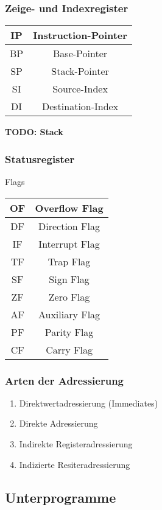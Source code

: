 \subsubsection{Zeige- und Indexregister}
\begin{tabular}{|c|c|}
\hline IP & Instruction-Pointer \\
\hline BP & Base-Pointer \\
\hline SP & Stack-Pointer\\
\hline SI & Source-Index \\
\hline DI & Destination-Index \\
\hline
\end{tabular}

{\bf TODO: Stack}

\subsubsection{Statusregister}

Flags

\begin{tabular}{|c|c|}
\hline OF & Overflow Flag \\
\hline DF & Direction Flag \\
\hline IF & Interrupt Flag \\
\hline TF & Trap Flag \\
\hline SF & Sign Flag \\
\hline ZF & Zero Flag \\
\hline AF & Auxiliary Flag \\
\hline PF & Parity Flag \\
\hline CF & Carry Flag \\
\hline
\end{tabular}

\subsubsection{Arten der Adressierung}
\begin{enumerate}
\item Direktwertadressierung (Immediates)
\item Direkte Adressierung
\item Indirekte Registeradressierung
\item Indizierte Resiteradressierung
\end{enumerate}


\subsection{Unterprogramme}
